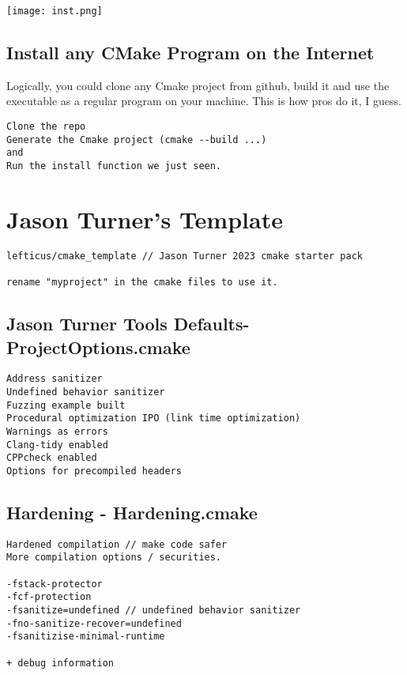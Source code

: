 \begin{center}
    \texttt{[image: inst.png]}
\end{center}

\subsection{Install any CMake Program on the Internet}

Logically, you could clone any Cmake project from github, build it and use the executable as a regular
program on your machine. This is how pros do it, I guess.


\begin{verbatim}
Clone the repo
Generate the Cmake project (cmake --build ...)
and
Run the install function we just seen.
\end{verbatim}

\section{Jason Turner's Template}

\begin{verbatim}
lefticus/cmake_template // Jason Turner 2023 cmake starter pack

rename "myproject" in the cmake files to use it.

\end{verbatim}

\subsection{Jason Turner Tools Defaults- ProjectOptions.cmake}

\begin{verbatim}
Address sanitizer
Undefined behavior sanitizer
Fuzzing example built
Procedural optimization IPO (link time optimization)
Warnings as errors
Clang-tidy enabled
CPPcheck enabled
Options for precompiled headers
\end{verbatim}

\subsection{Hardening - Hardening.cmake}

\begin{verbatim}
Hardened compilation // make code safer
More compilation options / securities.

-fstack-protector
-fcf-protection
-fsanitize=undefined // undefined behavior sanitizer
-fno-sanitize-recover=undefined
-fsanitizise-minimal-runtime

+ debug information 
\end{verbatim}


